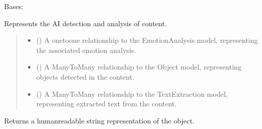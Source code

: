 \documentclass[letterpaper,10pt,english]{sphinxmanual}
\begin{document}
\begin{fulllineitems}
\label{\detokenize{source/meta_models_management:meta_models_management.models.AIDetection}}
\pysigstartsignatures
{}
\pysigstopsignatures
\sphinxAtStartPar
Bases: 

\sphinxAtStartPar
Represents the AI detection and analysis of content.
\begin{quote}\begin{description}
\begin{itemize}
\item {} 
\sphinxAtStartPar
{} () \textendash{} A one\sphinxhyphen{}to\sphinxhyphen{}one relationship to the EmotionAnalysis model, representing the associated emotion analysis.

\item {} 
\sphinxAtStartPar
{} () \textendash{} A ManyToMany relationship to the Object model, representing objects detected in the content.

\item {} 
\sphinxAtStartPar
{} () \textendash{} A ManyToMany relationship to the TextExtraction model, representing extracted text from the content.

\end{itemize}

\end{description}\end{quote}

\begin{fulllineitems}
\label{\detokenize{source/meta_models_management:meta_models_management.models.AIDetection.__str__}}
\pysigstartsignatures
{}
\pysigstopsignatures
\sphinxAtStartPar
Returns a human\sphinxhyphen{}readable string representation of the object.


\end{fulllineitems}
\end{fulllineitems}
\end{document}
